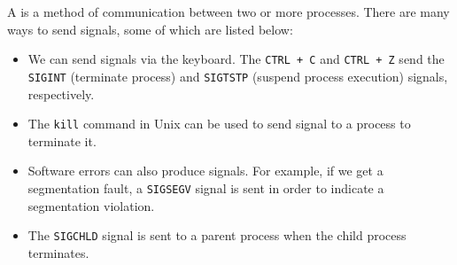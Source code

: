 A  is a method of communication between two or more processes. There are many ways to send signals, some of which are listed below: \begin{itemize}
    \item We can send signals via the keyboard. The \verb!CTRL + C! and \verb!CTRL + Z! send the \verb!SIGINT! (terminate process) and \verb!SIGTSTP! (suspend process execution) signals, respectively. 
    \item The \verb!kill! command in Unix can be used to send signal to a process to terminate it.
    \item Software errors can also produce signals. For example, if we get a segmentation fault, a \verb!SIGSEGV! signal is sent in order to indicate a segmentation violation. 
    \item The \verb!SIGCHLD! signal is sent to a parent process when the child process terminates.
\end{itemize}